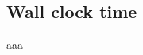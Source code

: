 \documentclass[a4paper]{article}
\begin{document}
\subsection*{Wall clock time}
\begin{minipage}{0.5\linewidth}
    \noindent{}
\end{minipage}\hfill
\begin{minipage}{0.4\linewidth}
aaa
\end{minipage}\hfill
\par\vspace{3ex}
\end{document}
